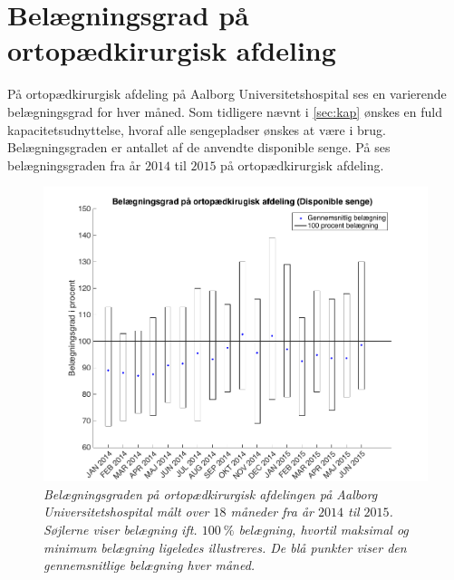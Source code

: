 \section{Belægningsgrad på ortopædkirurgisk afdeling} \label{omfang}
På ortopædkirurgisk afdeling på Aalborg Universitetshospital ses en varierende belægningsgrad for hver måned. Som tidligere nævnt i \ref{sec:kap} ønskes en fuld kapacitetsudnyttelse, hvoraf alle sengepladser ønskes at være i brug. Belægningsgraden er antallet af de anvendte disponible senge. På  ses belægningsgraden fra år $2014$ til $2015$ på ortopædkirurgisk afdeling. \cite{SDS2015}


\begin{figure}[H]
	\flushleft 
	\centering
	\includegraphics[scale=.45]{figures/maxminoverbelaeg.png}
	\flushleft
	\caption{\textit{Belægningsgraden på ortopædkirurgisk afdelingen på Aalborg Universitetshospital målt over $18$ måneder fra år $2014$ til $2015$. Søjlerne viser belægning ift. $100~\%$ belægning, hvortil maksimal og minimum belægning ligeledes illustreres. De blå punkter viser den gennemsnitlige belægning hver måned.}\cite{SDS2015}}
	\label{maxminbelaeg}
\end{figure}

